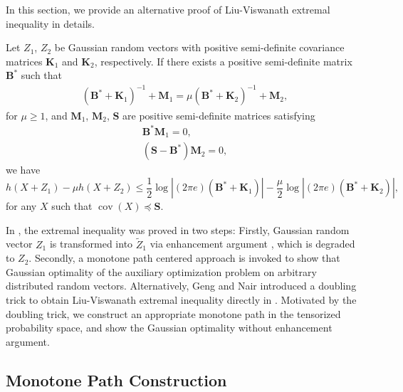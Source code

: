 \documentclass[journal,final, onecolumn]{IEEEtran}
\DeclareMathOperator{\cov}{cov}
\begin{document}
In this section, we provide an alternative proof of Liu-Viswanath extremal inequality in details.
\begin{theorem}\cite[Theorem 1]{LV07}\label{thm1}
Let $Z_{1}$, $Z_{2}$ be Gaussian random vectors with positive semi-definite covariance matrices $\boldsymbol{K}_{1}$ and $\boldsymbol{K}_{2}$, respectively. If there exists a positive semi-definite matrix $\boldsymbol{B}^{*}$ such that
\begin{align}
\left(   \boldsymbol{B}^{*} + \boldsymbol{K}_{1}   \right)^{-1} + \boldsymbol{M}_{1} = \mu \left(   \boldsymbol{B}^{*} + \boldsymbol{K}_{2}   \right)^{-1} + \boldsymbol{M}_{2},
\end{align}
for $\mu \geq 1$, and $\boldsymbol{M}_1$, $\boldsymbol{M}_2$, $\boldsymbol{S}$ are positive semi-definite matrices satisfying
\begin{align}
\boldsymbol{B}^{*}\boldsymbol{M}_{1} = 0,\\
\left(\boldsymbol{S} - \boldsymbol{B}^{*} \right) \boldsymbol{M}_2 =0,
\end{align}
we have
\begin{equation}
h(X+Z_1)-\mu h(X+Z_2) \leq \frac{1}{2} \log \left|  (2 \pi e) \left(\boldsymbol{B}^{*} + \boldsymbol{K}_{1}\right)          \right| - \frac{\mu}{2} \log \left|  (2 \pi e)\left( \boldsymbol{B}^{*} + \boldsymbol{K}_{2}   \right)       \right|,\label{eq:main}
\end{equation}
for any $X$ such that $\cov (X) \preceq \boldsymbol{S}$.
\end{theorem}
\begin{remark}
In \cite{LV07}, the extremal inequality was proved in two steps: Firstly, Gaussian random vector $Z_{1}$ is transformed into $\tilde{Z}_{1}$ via enhancement argument \cite{WLSSV09}, which is degraded to $Z_{2}$. Secondly, a monotone path centered approach is invoked to show that Gaussian optimality of the auxiliary optimization problem on arbitrary distributed random vectors. Alternatively, Geng and Nair introduced a doubling trick to obtain Liu-Viswanath extremal inequality directly in \cite{GN14}. Motivated by the doubling trick, we construct an appropriate monotone path in the tensorized probability space, and show the Gaussian optimality without enhancement argument.
\end{remark}

\subsection{Monotone Path Construction}
\end{document}
